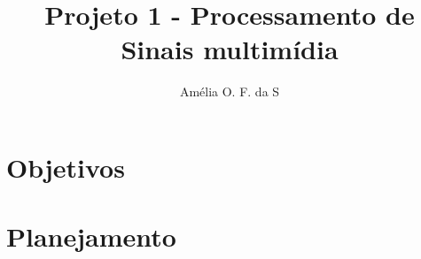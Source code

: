 \documentclass{article}
\title{Projeto 1 - Processamento de Sinais multimídia}
\author{Amélia O. F. da S}
\date{}
\begin{document}
\maketitle

\section{Objetivos}

\section{Planejamento}

\end{document}
